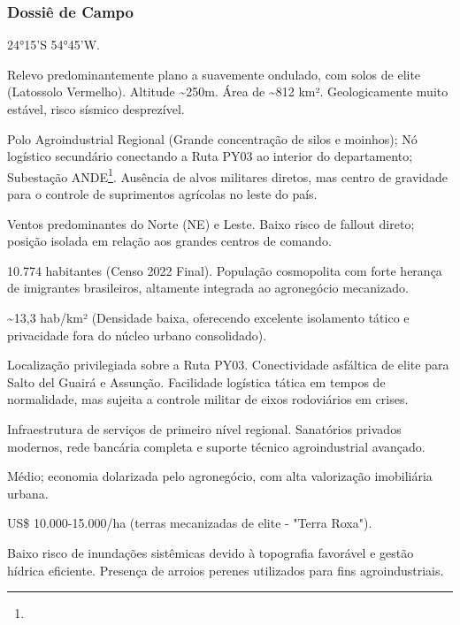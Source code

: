 \subsubsection{Dossiê de Campo}
\begin{description}[style=nextline,leftmargin=0.5cm,font=\bfseries]
\item[Coordenadas]  24°15'S 54°45'W.
\item[Topografia]  Relevo predominantemente plano a suavemente ondulado, com solos de elite (Latossolo Vermelho). Altitude \textasciitilde 250m. Área de \textasciitilde 812 km². Geologicamente muito estável, risco sísmico desprezível.
\item[Alvos Estratégicos]  Polo Agroindustrial Regional (Grande concentração de silos e moinhos); Nó logístico secundário conectando a Ruta PY03 ao interior do departamento; Subestação ANDE\footnote{\fineANDE}. Ausência de alvos militares diretos, mas centro de gravidade para o controle de suprimentos agrícolas no leste do país.
\item[Fallout]  Ventos predominantes do Norte (NE) e Leste. Baixo risco de fallout direto; posição isolada em relação aos grandes centros de comando.
\item[População]  10.774 habitantes (Censo 2022 Final). População cosmopolita com forte herança de imigrantes brasileiros, altamente integrada ao agronegócio mecanizado.
\item[Densidade]  \textasciitilde 13,3 hab/\allowbreak km² (Densidade baixa, oferecendo excelente isolamento tático e privacidade fora do núcleo urbano consolidado).
\item[Vias de Acesso]  Localização privilegiada sobre a Ruta PY03. Conectividade asfáltica de elite para Salto del Guairá e Assunção. Facilidade logística tática em tempos de normalidade, mas sujeita a controle militar de eixos rodoviários em crises.
\item[Serviços]  Infraestrutura de serviços de primeiro nível regional. Sanatórios privados modernos, rede bancária completa e suporte técnico agroindustrial avançado.
\item[Custo de Vida]  Médio; economia dolarizada pelo agronegócio, com alta valorização imobiliária urbana.
\item[Preço da Terra]  US\$ 10.000-15.000/\allowbreak ha (terras mecanizadas de elite - "Terra Roxa").
\item[Hidrologia]  Baixo risco de inundações sistêmicas devido à topografia favorável e gestão hídrica eficiente. Presença de arroios perenes utilizados para fins agroindustriais.

\end{description}
